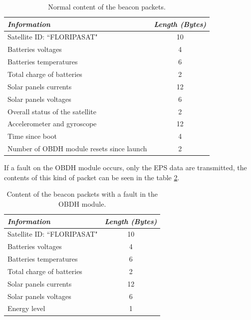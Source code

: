 \begin{table}[!h]
	\begin{center}
		\begin{tabular}{lc}
			\toprule[1.5pt]
			\textit{Information} & \textit{Length (Bytes)} \\
			\midrule
			Satellite ID: ``FLORIPASAT" & 10 \\
			Batteries voltages & 4 \\
			Batteries temperatures & 6 \\
			Total charge of batteries & 2 \\
			Solar panels currents & 12 \\
			Solar panels voltages & 6 \\
			Overall status of the satellite & 2 \\
			Accelerometer and gyroscope & 12 \\
			Time since boot & 4 \\
			Number of OBDH module resets since launch & 2 \\
			\bottomrule[1.5pt]
		\end{tabular}
		\caption{Normal content of the beacon packets.}
		\label{tab:beacon-normal-payload}
	\end{center}
\end{table}

If a fault on the OBDH module occurs, only the EPS data are transmitted, the contents of this kind of packet can be seen in the table \ref{tab:beacon-without-obdh-payload}.

\begin{table}[!h]
	\begin{center}
		\begin{tabular}{lc}
			\toprule[1.5pt]
			\textit{Information} & \textit{Length (Bytes)} \\
			\midrule
			Satellite ID: ``FLORIPASAT" & 10 \\
			Batteries voltages & 4 \\
			Batteries temperatures & 6 \\
			Total charge of batteries & 2 \\
			Solar panels currents & 12 \\
			Solar panels voltages & 6 \\
			Energy level & 1 \\
			\bottomrule[1.5pt]
		\end{tabular}
		\caption{Content of the beacon packets with a fault in the OBDH module.}
		\label{tab:beacon-without-obdh-payload}
	\end{center}
\end{table}

